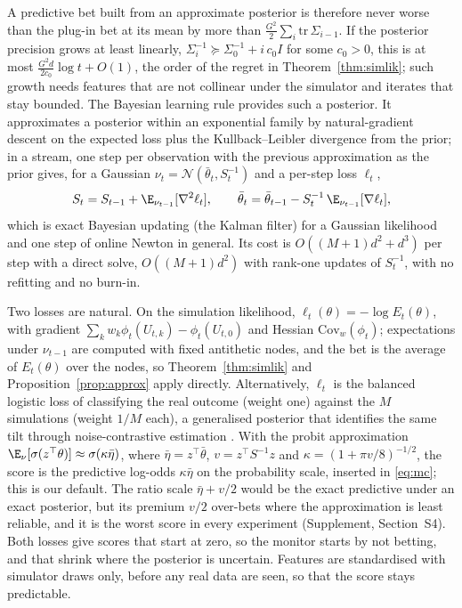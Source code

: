 A predictive bet built from an approximate posterior is therefore never worse
than the plug-in bet at its mean by more than
$\frac{G^2}{2}\sum_i \mathrm{tr}\,\Sigma_{i-1}$. If the posterior precision grows
at least linearly, $\Sigma_i^{-1} \succeq \Sigma_0^{-1} + i\,c_0 I$ for some
$c_0 > 0$, this is at most $\frac{G^2 d}{2c_0}\log t + O(1)$, the order of the
regret in Theorem~\ref{thm:simlik}; such growth needs features that are not
collinear under the simulator and iterates that stay bounded. The Bayesian
learning rule \citep{khan2023bayesian} provides such a posterior. It
approximates a posterior within an exponential family by natural-gradient
descent on the expected loss plus the Kullback--Leibler divergence from the
prior; in a stream, one step per observation with the previous approximation
as the prior \citep{jones2024bong} gives, for a Gaussian
$\nu_t = \mathcal N(\bar\theta_t, S_t^{-1})$ and a per-step loss $\ell_t$,
\begin{equation}\label{eq:blr}
S_t = S_{t-1} + \E_{\nu_{t-1}}[\nabla^2 \ell_t], \qquad
\bar\theta_t = \bar\theta_{t-1} - S_t^{-1}\, \E_{\nu_{t-1}}[\nabla \ell_t],
\end{equation}
which is exact Bayesian updating (the Kalman filter) for a Gaussian likelihood
and one step of online Newton in general. Its cost is $O((M+1)d^2 + d^3)$ per
step with a direct solve, $O((M+1)d^2)$ with rank-one updates of $S_t^{-1}$,
with no refitting and no burn-in.

Two losses are natural. On the simulation likelihood,
$\ell_t(\theta) = -\log E_t(\theta)$, with gradient
$\sum_k w_k \phi_t(U_{t,k}) - \phi_t(U_{t,0})$ and Hessian
$\mathrm{Cov}_w(\phi_t)$; expectations under $\nu_{t-1}$ are computed with
fixed antithetic nodes, and the bet is the average of $E_t(\theta)$ over the
nodes, so Theorem~\ref{thm:simlik} and Proposition~\ref{prop:approx} apply
directly. Alternatively, $\ell_t$ is the balanced logistic loss of classifying
the real outcome (weight one) against the $M$ simulations (weight $1/M$ each),
a generalised posterior \citep{bissiri2016general,sinharoy2026prequential}
that identifies the same tilt through noise-contrastive estimation
\citep{gutmann2012noise}. With the probit approximation
$\E_\nu[\sigma(z^\top\theta)] \approx \sigma(\kappa\bar\eta)$, where
$\bar\eta = z^\top\bar\theta$, $v = z^\top S^{-1}z$ and
$\kappa = (1+\pi v/8)^{-1/2}$, the score is the predictive log-odds
$\kappa\bar\eta$ on the probability scale, inserted in \eqref{eq:mc}; this is
our default. The ratio scale $\bar\eta + v/2$ would be the exact predictive
under an exact posterior, but its premium $v/2$ over-bets where the
approximation is least reliable, and it is the worst score in every experiment
(Supplement, Section~S4). Both losses give scores that start at zero, so the
monitor starts by not betting, and that shrink where the posterior is
uncertain. Features are standardised with simulator draws only, before any
real data are seen, so that the score stays predictable.


